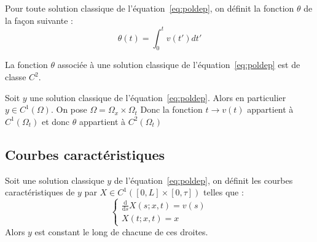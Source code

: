 \documentclass[a4paper]{article}
\begin{document}
\begin{definition} 
	Pour toute solution classique de l'équation~\eqref{eq:poldep}, on définit la fonction $\theta$ de la façon suivante : 
	\[ \theta (t) = \int_0^tv(t')dt'\]
\end{definition}

\begin{lemme}
	La fonction $\theta$ associée à une solution classique de l'équation~\eqref{eq:poldep} est de classe $C^2$.
\end{lemme}

\begin{preuve}
	Soit $y$ une solution classique de l'équation~\eqref{eq:poldep}. Alors en particulier $y \in C^1(\Omega)$.
	On pose $\Omega = \Omega_x \times \Omega_t$ 
	Donc la fonction $t \to v(t)$ appartient à $C^1(\Omega_t)$ et donc $\theta$ appartient à $C^2(\Omega_t)$  
\end{preuve}

\subsection{Courbes caractéristiques}


\begin{definition}
	Soit une solution classique $y$ de l'équation~\eqref{eq:poldep},
	on définit les courbes caractéristiques de $y$ par $X \in C^1([0,L]\times[0,\tau])$ telles que :
	\[
	\begin{cases}
		\displaystyle \frac{\mathrm{d}}{\mathrm{d}s} X(s;x,t)= v(s)\\
		X(t;x,t) = x
	\end{cases}
	\]
	Alors $y$ est constant le long de chacune de ces droites.
\end{definition}
\end{document}
